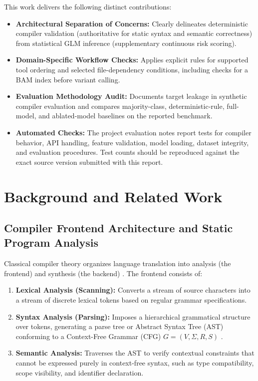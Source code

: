 \documentclass[12pt,a4paper]{article}
\begin{document}
This work delivers the following distinct contributions:
\begin{itemize}
    \item \textbf{Architectural Separation of Concerns:} Clearly delineates deterministic compiler validation (authoritative for static syntax and semantic correctness) from statistical GLM inference (supplementary continuous risk scoring).
    \item \textbf{Domain-Specific Workflow Checks:} Applies explicit rules for supported tool ordering and selected file-dependency conditions, including checks for a BAM index before variant calling.
    \item \textbf{Evaluation Methodology Audit:} Documents target leakage in synthetic compiler evaluation and compares majority-class, deterministic-rule, full-model, and ablated-model baselines on the reported benchmark.
    \item \textbf{Automated Checks:} The project evaluation notes report tests for compiler behavior, API handling, feature validation, model loading, dataset integrity, and evaluation procedures. Test counts should be reproduced against the exact source version submitted with this report.
\end{itemize}

\newpage

\section{Background and Related Work}

\subsection{Compiler Frontend Architecture and Static Program Analysis}

Classical compiler theory organizes language translation into analysis (the frontend) and synthesis (the backend) \cite{aho2006}. The frontend consists of:
\begin{enumerate}
    \item \textbf{Lexical Analysis (Scanning):} Converts a stream of source characters into a stream of discrete lexical tokens based on regular grammar specifications.
    \item \textbf{Syntax Analysis (Parsing):} Imposes a hierarchical grammatical structure over tokens, generating a parse tree or Abstract Syntax Tree (AST) conforming to a Context-Free Grammar (CFG) $G = (V, \Sigma, R, S)$ \cite{cooper2011}.
    \item \textbf{Semantic Analysis:} Traverses the AST to verify contextual constraints that cannot be expressed purely in context-free syntax, such as type compatibility, scope visibility, and identifier declaration.
\end{enumerate}
\end{document}
